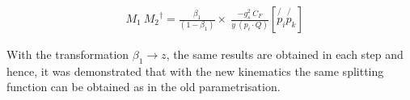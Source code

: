 \begin{equation}
\begin{split}
&M_1\: {M_2}^{\dagger} = \frac{\beta_1}{(1-\beta_1)} \times \: \frac{-g_s^2\: C_F }{y \:(p_i \cdot Q)} [\not{p_i} \not{p_k}]
\end{split}
\end{equation}

With the transformation $ \beta_1 \rightarrow z $, the same results are obtained in each step and hence, it was demonstrated that with the new kinematics the same splitting function can be obtained as in the old parametrisation.
\newpage